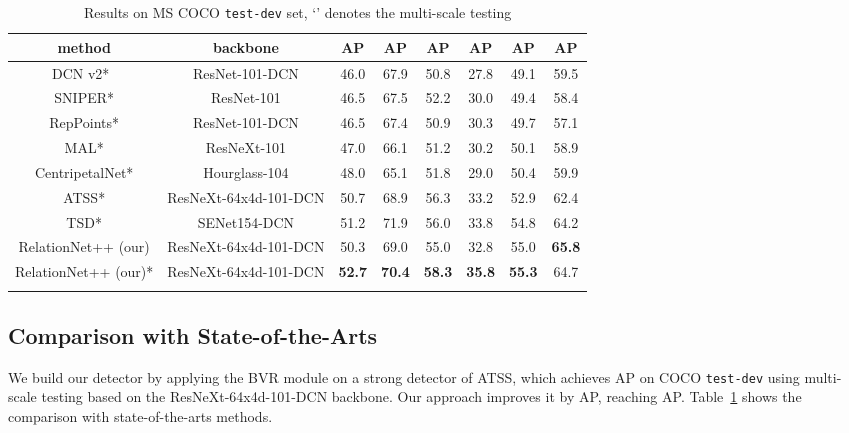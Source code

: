 \documentclass{article}
\begin{document}
\begin{table}[t]
\renewcommand\arraystretch{1.02}
\newcommand{\tabincell}[2]{\begin{tabular}{@{}#1@{}}#2\end{tabular}}
\centering
\caption{Results on MS COCO {\tt test-dev} set, `' denotes the multi-scale testing}
\small \setlength{\tabcolsep}{6pt}
\begin{threeparttable}
\begin{tabular}{c|c|ccc|ccc}
\Xhline{1.0pt}
method &backbone &AP &AP &AP &AP &AP &AP\\
\hline
DCN v2*~\cite{DCNv2}                                     & ResNet-101-DCN & 46.0 & 67.9 & 50.8 & 27.8 & 49.1 & 59.5\\
SNIPER* \cite{SNIPER}                                    &ResNet-101 &46.5 &67.5 &52.2 &30.0 &49.4 &58.4 \\
RepPoints* \cite{RepPoints}                              &ResNet-101-DCN &46.5 &67.4 &50.9 &30.3 &49.7 &57.1 \\
MAL* \cite{DBLP:journals/corr/abs-1912-02252}            &ResNeXt-101 &47.0 &66.1 &51.2 &30.2 &50.1 &58.9 \\
CentripetalNet* \cite{DBLP:journals/corr/abs-2003-09119} &Hourglass-104 &48.0 &65.1 &51.8 &29.0 &50.4 &59.9 \\
ATSS* \cite{zhang2019bridging}                           &ResNeXt-64x4d-101-DCN &50.7 &68.9 &56.3 &33.2 &52.9 &62.4 \\
TSD* \cite{DBLP:journals/corr/abs-2003-07540}            &SENet154-DCN &51.2 &71.9 &56.0 &33.8 &54.8 &64.2 \\
\hline
RelationNet++ (our)                                          &ResNeXt-64x4d-101-DCN &50.3 &69.0 &55.0 &32.8 &55.0 &\bf{65.8} \\
RelationNet++ (our)*                                         &ResNeXt-64x4d-101-DCN & \bf{52.7} &\bf{70.4} &\bf{58.3} &\bf{35.8} &\bf{55.3} &64.7 \\
\Xhline{1.0pt}
\end{tabular}
\end{threeparttable}
\label{tab:coco}
\vspace{-1em}
\end{table}
\vspace{-2mm}
\subsection{Comparison with State-of-the-Arts}
\vspace{-2mm}
We build our detector by applying the BVR module on a strong detector of ATSS, which achieves  AP on COCO {\tt test-dev} using multi-scale testing based on the ResNeXt-64x4d-101-DCN backbone. Our approach improves it by  AP, reaching  AP. Table~\ref{tab:coco} shows the comparison with state-of-the-arts methods. 
\vspace{-3mm}
\end{document}
